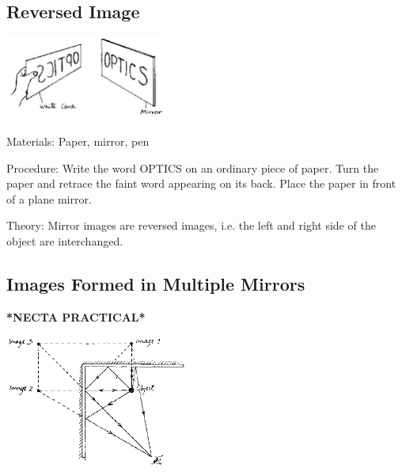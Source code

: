 \begin{multicols}{2}
\vfill
\columnbreak

\subsection{Reversed Image}

\begin{center}
\includegraphics[width=0.4\textwidth]{./img/source/reversed-image-2.jpg}
\end{center}

\begin{description*}
\item[Materials:]{Paper, mirror, pen}
\item[Procedure:]{Write the word OPTICS on an ordinary piece of paper. Turn the paper and retrace the faint word appearing on its back. Place the paper in front of a plane mirror.}
\item[Theory:]{Mirror images are reversed images, i.e. the left and right side of the object are
interchanged.}
\end{description*}

\subsection{Images Formed in Multiple Mirrors}
\textbf{*NECTA PRACTICAL*}

\begin{center}
\includegraphics[width=0.45\textwidth]{./img/source/multiple-mirrors.png}
\end{center}


\end{multicols}
